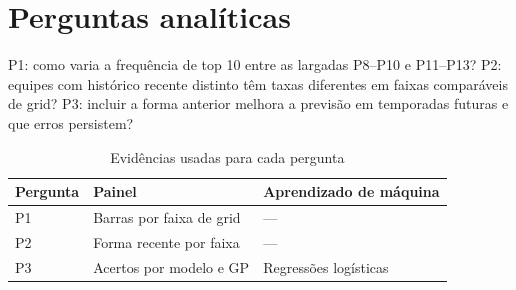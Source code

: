 \documentclass[conference,a4paper]{IEEEtran}
\begin{document}
\section{Perguntas analíticas}
P1: como varia a frequência de top 10 entre as largadas P8--P10 e P11--P13? P2: equipes com histórico recente distinto têm taxas diferentes em faixas comparáveis de grid? P3: incluir a forma anterior melhora a previsão em temporadas futuras e que erros persistem?
\begin{table}[h]\centering\caption{Evidências usadas para cada pergunta}
\begin{tabular}{lll}\hline Pergunta&Painel&Aprendizado de máquina\\\hline
P1&Barras por faixa de grid&---\\
P2&Forma recente por faixa&---\\
P3&Acertos por modelo e GP&Regressões logísticas\\\hline
\end{tabular}\end{table}
\end{document}
